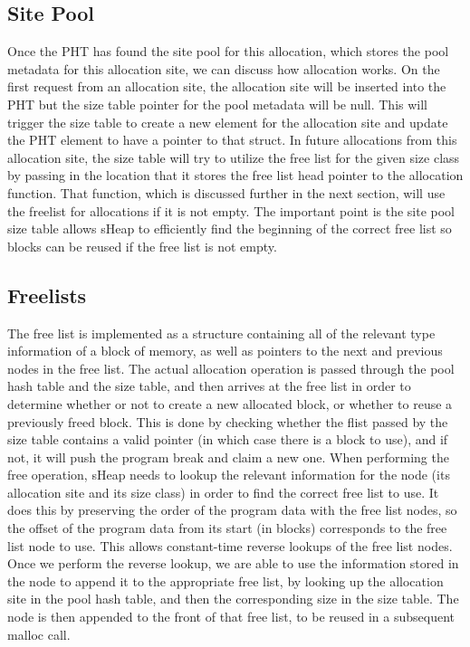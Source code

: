 \documentclass[conference]{IEEEtran}
\begin{document}
\subsection{Site Pool}
Once the PHT has found the site pool for this allocation, which stores the pool metadata for this allocation site, we can discuss how allocation works. 
On the first request from an allocation site, the allocation site will be 
inserted into the PHT but the size table pointer for the pool metadata will be 
null. This will trigger the size table to create a new element for the 
allocation site and update the PHT element to have a pointer to that struct. In 
future allocations from this allocation site, the size table will try to utilize 
the free list for the given size class by passing in the location that it stores 
the free list head pointer to the allocation function. That function, which is discussed further in the next section, will use the freelist for allocations if it is not empty.  The important point is the site pool size table allows sHeap to efficiently find the beginning of the correct free list so blocks can be reused if the free list is not empty. 

\subsection{Freelists}
The free list is implemented as a structure containing all of the relevant type 
information of a block of memory, as well as pointers to the next and previous nodes in the free list. 
The actual allocation operation is passed through the pool hash table and the size 
table, and then arrives at the free list in order to determine whether or not to 
create a new allocated block, or whether to reuse a previously freed block. This 
is done by checking whether the flist passed by the size table contains a valid 
pointer (in which case there is a block to use), and if not, it will push the 
program break and claim a new one. When performing the free operation, sHeap needs 
to lookup the relevant information for the node (its allocation site and its size 
class) in order to find the correct free list to use. It does this by preserving 
the order of the program data with the free list nodes, so the offset of the 
program data from its start (in blocks) corresponds to the free list node to use. 
This allows constant-time reverse lookups of the free list nodes. Once we perform 
the reverse lookup, we are able to use the information stored in the node to 
append it to the appropriate free list, by looking up the allocation site in the 
pool hash table, and then the corresponding size in the size table. The node is 
then appended to the front of that free list, to be reused in a subsequent malloc 
call.
\end{document}

